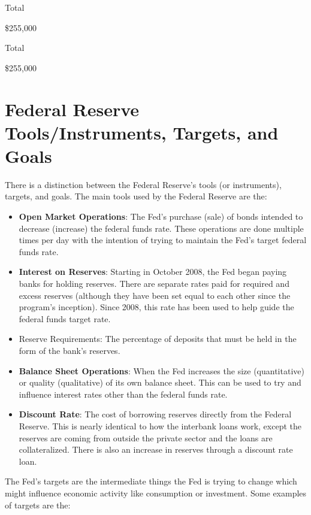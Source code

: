 \documentclass[
]{book}
\providecommand{\tightlist}{%
  \setlength{\itemsep}{0pt}\setlength{\parskip}{0pt}}
\begin{document}
Total

\$255,000

Total

\$255,000

\hypertarget{federal-reserve-toolsinstruments-targets-and-goals}{%
\section{Federal Reserve Tools/Instruments, Targets, and Goals}\label{federal-reserve-toolsinstruments-targets-and-goals}}

There is a distinction between the Federal Reserve's tools (or instruments), targets, and goals. The main tools used by the Federal Reserve are the:

\begin{itemize}
\tightlist
\item
  \textbf{Open Market Operations}: The Fed's purchase (sale) of bonds intended to decrease (increase) the federal funds rate. These operations are done multiple times per day with the intention of trying to maintain the Fed's target federal funds rate.
\item
  \textbf{Interest on Reserves}: Starting in October 2008, the Fed began paying banks for holding reserves. There are separate rates paid for required and excess reserves (although they have been set equal to each other since the program's inception). Since 2008, this rate has been used to help guide the federal funds target rate.
\item
  Reserve Requirements: The percentage of deposits that must be held in the form of the bank's reserves.
\item
  \textbf{Balance Sheet Operations}: When the Fed increases the size (quantitative) or quality (qualitative) of its own balance sheet. This can be used to try and influence interest rates other than the federal funds rate.
\item
  \textbf{Discount Rate}: The cost of borrowing reserves directly from the Federal Reserve. This is nearly identical to how the interbank loans work, except the reserves are coming from outside the private sector and the loans are collateralized. There is also an increase in reserves through a discount rate loan.
\end{itemize}

The Fed's targets are the intermediate things the Fed is trying to change which might influence economic activity like consumption or investment. Some examples of targets are the:
\end{document}
